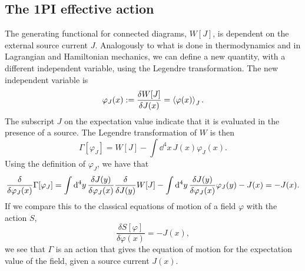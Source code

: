 \subsection*{The 1PI effective action}

\label{section: effective action}
The generating functional for connected diagrams, $W[J]$, is dependent on the external source current $J$.
Analogously to what is done in thermodynamics and in Lagrangian and Hamiltonian mechanics, we can define a new quantity, with a different independent variable, using the Legendre transformation.
The new independent variable is 
\begin{equation}
    \varphi_J(x) := \frac{\delta W[J]}{\delta J(x)} = \ex{\varphi(x)}_J.
\end{equation}
The subscript $J$ on the expectation value indicate that it is evaluated in the presence of a source.
The Legendre transformation of $W$ is then
\begin{equation}
    \label{1PI effective action}
    \Gamma[\varphi_J]
    = W[J] - \int \dd^4 x \, J(x) \varphi_J(x).
\end{equation}
Using the definition of $\varphi_J$, we have that
\begin{equation}
    \label{effective equation of motion}
    \fdv{\varphi_J(x)} \Gamma[\varphi_J]
    = \int \dd^4 y \, \fdv{J(y)}{\varphi_J(x)} \fdv{J(y)} W[J]
    - \int \dd^4 y \, \fdv{J(y)}{\varphi_J(x)} \varphi_J(y)
    - J(x)
    = - J(x).
\end{equation}
If we compare this to the classical equations of motion of a field $\varphi$ with the action $S$,
\begin{equation}
    \frac{\delta S[\varphi]}{\delta \varphi(x)} = -J(x),
\end{equation}
we see that $\Gamma$ is an action that gives the equation of motion for the expectation value of the field, given a source current $J(x)$.

